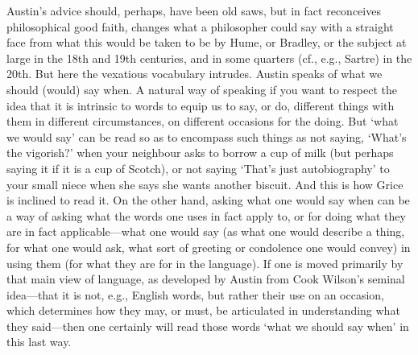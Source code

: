 Austin’s advice should, perhaps, have been old saws, but in fact reconceives philosophical good faith, changes what a philosopher could say with a straight face from what this would be taken to be by Hume, or Bradley, or the subject at large in the 18th and 19th centuries, and in some quarters (cf., e.g., Sartre) in the 20th. But here the vexatious vocabulary intrudes. Austin speaks of what we should (would) say when. A natural way of speaking if you want to respect the idea that it is intrinsic to words to equip us to say, or do, different things with them in different circumstances, on different occasions for the doing. But `what we would say' can be read so as to encompass such things as not saying, `What’s the vigorish?' when your neighbour asks to borrow a cup of milk (but perhaps saying it if it is a cup of Scotch), or not saying `That’s just autobiography' to your small niece when she says she wants another biscuit. And this is how Grice is inclined to read it. On the other hand, asking what one would say when can be a way of asking what the words one uses in fact apply to, or for doing what they are in fact applicable---what one would say (as what one would describe a thing, for what one would ask, what sort of greeting or condolence one would convey) in using them (for what they are for in the language). If one is moved primarily by that main view of language, as developed by Austin from Cook Wilson’s seminal idea---that it is not, e.g., English words, but rather their use on an occasion, which determines how they may, or must, be articulated in understanding what they said---then one certainly will read those words `what we should say when' in this last way.

